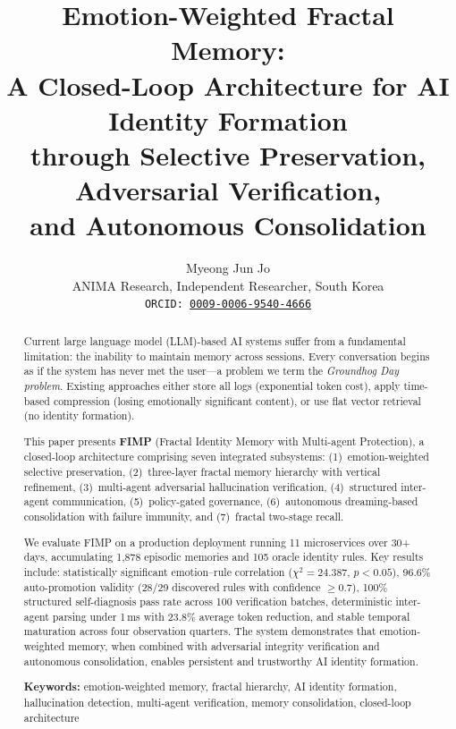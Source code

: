 \documentclass[11pt,a4paper]{article}
\title{%
  \textbf{Emotion-Weighted Fractal Memory:\\
  A Closed-Loop Architecture for AI Identity Formation\\
  through Selective Preservation, Adversarial Verification,\\
  and Autonomous Consolidation}
}
\author{%
  Myeong Jun Jo \\
  ANIMA Research, Independent Researcher, South Korea \\
  \texttt{ORCID: \href{https://orcid.org/0009-0006-9540-4666}{0009-0006-9540-4666}}
}
\date{}
\begin{document}
\maketitle

\begin{abstract}
Current large language model (LLM)-based AI systems suffer from a fundamental limitation: the inability to maintain memory across sessions. Every conversation begins as if the system has never met the user---a problem we term the \emph{Groundhog Day problem}. Existing approaches either store all logs (exponential token cost), apply time-based compression (losing emotionally significant content), or use flat vector retrieval (no identity formation).

This paper presents \textbf{FIMP} (Fractal Identity Memory with Multi-agent Protection), a closed-loop architecture comprising seven integrated subsystems: (1)~emotion-weighted selective preservation, (2)~three-layer fractal memory hierarchy with vertical refinement, (3)~multi-agent adversarial hallucination verification, (4)~structured inter-agent communication, (5)~policy-gated governance, (6)~autonomous dreaming-based consolidation with failure immunity, and (7)~fractal two-stage recall.

We evaluate FIMP on a production deployment running 11 microservices over 30+ days, accumulating 1,878 episodic memories and 105 oracle identity rules. Key results include: statistically significant emotion--rule correlation ($\chi^2 = 24.387$, $p < 0.05$), 96.6\% auto-promotion validity (28/29 discovered rules with confidence $\geq 0.7$), 100\% structured self-diagnosis pass rate across 100 verification batches, deterministic inter-agent parsing under 1\,ms with 23.8\% average token reduction, and stable temporal maturation across four observation quarters. The system demonstrates that emotion-weighted memory, when combined with adversarial integrity verification and autonomous consolidation, enables persistent and trustworthy AI identity formation.

\vspace{6pt}
\noindent\textbf{Keywords:} emotion-weighted memory, fractal hierarchy, AI identity formation,
hallucination detection, multi-agent verification, memory consolidation, closed-loop architecture
\end{abstract}

\end{document}
